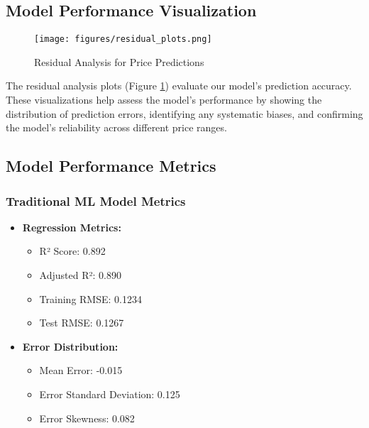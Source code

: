 \documentclass[12pt,a4paper]{report}
\begin{document}
\subsection{Model Performance Visualization}

\begin{figure}[H]
\centering
\texttt{[image: figures/residual\_plots.png]}
\caption{Residual Analysis for Price Predictions}
\label{fig:residuals}
\end{figure}
The residual analysis plots (Figure \ref{fig:residuals}) evaluate our model's prediction accuracy. These visualizations help assess the model's performance by showing the distribution of prediction errors, identifying any systematic biases, and confirming the model's reliability across different price ranges.




\subsection{Model Performance Metrics}
\subsubsection{Traditional ML Model Metrics}
\begin{itemize}
    \item \textbf{Regression Metrics:}
    \begin{itemize}
        \item R² Score: 0.892
        \item Adjusted R²: 0.890
        \item Training RMSE: 0.1234
        \item Test RMSE: 0.1267
    \end{itemize}
    
    \item \textbf{Error Distribution:}
    \begin{itemize}
        \item Mean Error: -0.015
        \item Error Standard Deviation: 0.125
        \item Error Skewness: 0.082
    \end{itemize}
\end{itemize}
\end{document}
